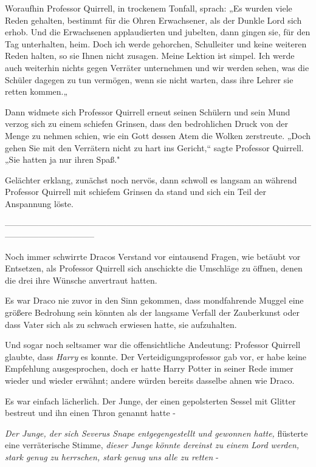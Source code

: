 {Woraufhin Professor Quirrell, in trockenem Tonfall, sprach: „Es wurden viele Reden gehalten, bestimmt für die Ohren Erwachsener, als der Dunkle Lord sich erhob. Und die Erwachsenen applaudierten und jubelten, dann gingen sie, für den Tag unterhalten, heim. Doch ich werde gehorchen, Schulleiter und keine weiteren Reden halten, so sie Ihnen nicht zusagen. Meine Lektion ist simpel. Ich werde auch weiterhin nichts gegen Verräter unternehmen und wir werden sehen, was die Schüler dagegen zu tun vermögen, wenn sie nicht warten, dass ihre Lehrer sie retten kommen.„

Dann widmete sich Professor Quirrell erneut seinen Schülern und sein Mund verzog sich zu einem schiefen Grinsen, dass den bedrohlichen Druck von der Menge zu nehmen schien, wie ein Gott dessen Atem die Wolken zerstreute. „Doch gehen Sie mit den Verrätern nicht zu hart ins Gericht,“ sagte Professor Quirrell. „Sie hatten ja nur ihren Spaß."

Gelächter erklang, zunächst noch nervös, dann schwoll es langsam an während Professor Quirrell mit schiefem Grinsen da stand und sich ein Teil der Anspannung löste.

--------------------------------------------------------------------------------------------------------------------------------------------

\hfill\break Noch immer schwirrte Dracos Verstand vor eintausend Fragen, wie betäubt vor Entsetzen, als Professor Quirrell sich anschickte die Umschläge zu öffnen, denen die drei ihre Wünsche anvertraut hatten.

Es war Draco nie zuvor in den Sinn gekommen, dass mondfahrende Muggel eine größere Bedrohung sein könnten als der langsame Verfall der Zauberkunst oder dass Vater sich als zu schwach erwiesen hatte, sie aufzuhalten.

Und sogar noch seltsamer war die offensichtliche Andeutung: Professor Quirrell glaubte, dass \emph{Harry} es konnte. Der Verteidigungsprofessor gab vor, er habe keine Empfehlung ausgesprochen, doch er hatte Harry Potter in seiner Rede immer wieder und wieder erwähnt; andere würden bereits dasselbe ahnen wie Draco.

Es war einfach lächerlich. Der Junge, der einen gepolsterten Sessel mit Glitter bestreut und ihn einen Thron genannt hatte -

\emph{Der Junge, der sich Severus Snape entgegengestellt und gewonnen hatte,} flüsterte eine verräterische Stimme, \emph{dieser Junge könnte} \emph{dereinst zu einem} \emph{Lord} \emph{werden, stark genug zu herrschen, stark genug uns alle zu retten} -

}

